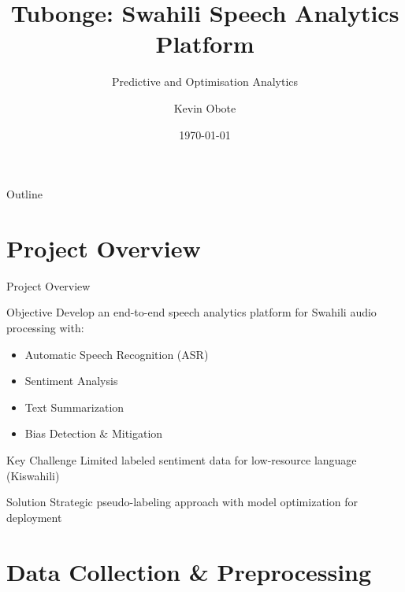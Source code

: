 \documentclass[aspectratio=169,10pt]{beamer}
\title[Tubonge: Speech Analytics]{Tubonge: Swahili Speech Analytics Platform}
\subtitle{Predictive and Optimisation Analytics}
\author{Kevin Obote}
\institute{Student No: 190696}
\date{\today}
\begin{document}
\begin{frame}
\titlepage
\end{frame}

\begin{frame}{Outline}
\tableofcontents
\end{frame}

\section{Project Overview}

\begin{frame}{Project Overview}
\begin{block}{Objective}
Develop an end-to-end speech analytics platform for Swahili audio processing with:
\begin{itemize}
    \item Automatic Speech Recognition (ASR)
    \item Sentiment Analysis
    \item Text Summarization
    \item Bias Detection \& Mitigation
\end{itemize}
\end{block}

\begin{block}{Key Challenge}
Limited labeled sentiment data for low-resource language (Kiswahili)
\end{block}

\begin{block}{Solution}
Strategic pseudo-labeling approach with model optimization for deployment
\end{block}
\end{frame}

\section{Data Collection \& Preprocessing}
\end{document}
